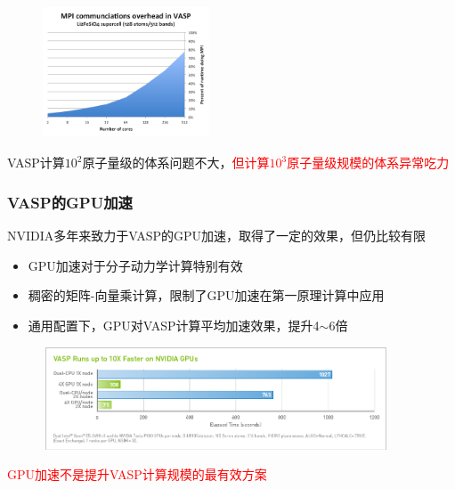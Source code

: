 {\begin{figure}[h!]
%
\includegraphics[height=1.55in,width=1.95in,viewport=0 0 240 200,clip]{Figures/VASP-mpi-Li128.png}
\label{ABINIT_vs_VASP-3}
\end{figure} 
\textrm{VASP}计算$10^2$原子量级的体系问题不大，\textcolor{red}{但计算$10^3$原子量级规模的体系异常吃力}

}

\frame
{
	\frametitle{\textrm{VASP}的\textrm{GPU}加速}
\textrm{NVIDIA}多年来致力于\textrm{VASP}的\textrm{GPU}加速，取得了一定的效果，但仍比较有限
\begin{itemize}
	\item \textrm{GPU}加速对于分子动力学计算特别有效
	\item 稠密的矩阵-向量乘计算，限制了\textrm{GPU}加速在第一原理计算中应用
	\item 通用配置下，\textrm{GPU}对\textrm{VASP}计算平均加速效果，提升\textrm{4$\sim$6}倍
\end{itemize}
\begin{figure}[h!]
	\vspace{-0.15in}
\centering
\includegraphics[height=1.2in,width=4.05in,viewport=0 0 850 260,clip]{Figures/VASP-GPU-CPU.png}
\label{VASP_GPU}
\end{figure} 
	\vspace{-0.15in}
\textcolor{red}{\textrm{GPU}加速不是提升\textrm{VASP}计算规模的最有效方案}
}

